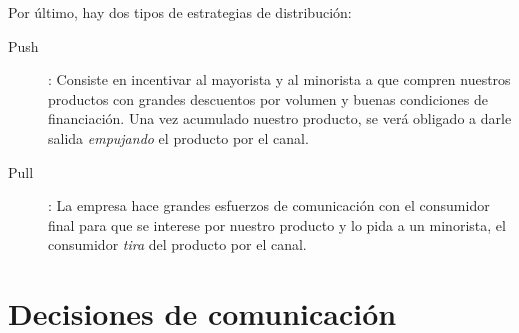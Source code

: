 \documentclass[10pt,a4paper,spanish]{report}
\begin{document}
		Por último, hay dos tipos de estrategias de distribución:
		\begin{description}
			\item[Push]: Consiste en incentivar al mayorista y al minorista a que compren nuestros productos con grandes descuentos por volumen y buenas condiciones de financiación. Una vez acumulado nuestro producto, se verá obligado a darle salida \textit{\textcolor[rgb]{0.1,0.2,0.4}{empujando}} el producto por el canal.
			\item[Pull]: La empresa hace grandes esfuerzos de comunicación con el consumidor final para que se interese por nuestro producto y lo pida a un minorista, el consumidor \textit{\textcolor[rgb]{0.1,0.2,0.4}{tira}} del producto por el canal.
		\end{description}

	\section{\textcolor[rgb]{0.1,0.2,0.4}Decisiones de comunicación}
\end{document}
